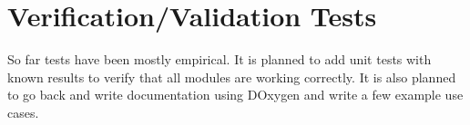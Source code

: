 \documentclass[12pt]{article}
\begin{document}
\section{Verification/Validation Tests}
So far tests have been mostly empirical. It is planned to add unit tests with known results to verify that all modules are working correctly. It is also planned to go back and write documentation using DOxygen and write a few example use cases.
\end{document}
